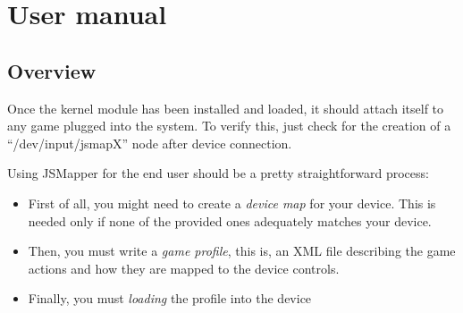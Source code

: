 \chapter{User manual}\label{chap:usermanual}
\section{Overview}
Once the kernel module has been installed and loaded, it should attach itself to any game plugged into the system. To verify this, just check for the creation of a ``/dev/input/jsmapX'' node after device connection.

Using JSMapper for the end user should be a pretty straightforward process:
\begin{itemize}
	\item First of all, you might need to create a \emph{device map} for your device. This is needed only if none of the provided ones adequately matches your device. 
	\item Then, you must write a \emph{game profile}, this is, an XML file describing the game actions and how they are mapped to the device controls.
	\item Finally, you must \emph{loading} the profile into the device
\end{itemize}
